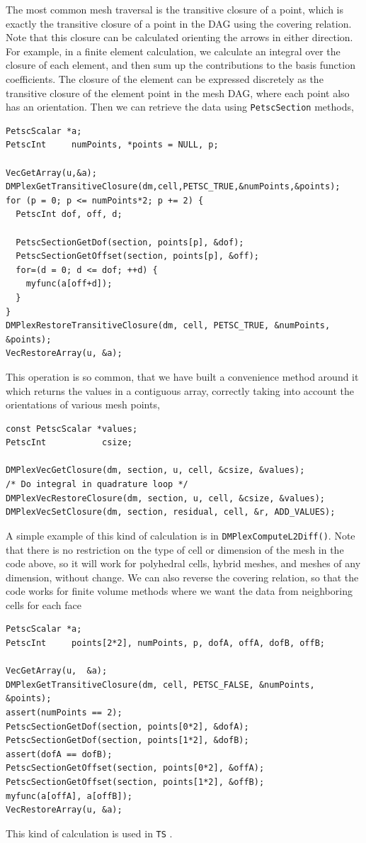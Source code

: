 The most common mesh traversal is the transitive closure of a point, which is exactly the transitive closure of a point
in the DAG using the covering relation. Note that this closure can be calculated orienting the arrows in either
direction. For example, in a finite element calculation, we calculate an integral over the closure of each element, and
then sum up the contributions to the basis function coefficients. The closure of the element can be expressed discretely
as the transitive closure of the element point in the mesh DAG, where each point also has an orientation. Then we can
retrieve the data using \lstinline{PetscSection} methods,
\begin{lstlisting}
PetscScalar *a;
PetscInt     numPoints, *points = NULL, p;

VecGetArray(u,&a);
DMPlexGetTransitiveClosure(dm,cell,PETSC_TRUE,&numPoints,&points);
for (p = 0; p <= numPoints*2; p += 2) {
  PetscInt dof, off, d;

  PetscSectionGetDof(section, points[p], &dof);
  PetscSectionGetOffset(section, points[p], &off);
  for=(d = 0; d <= dof; ++d) {
    myfunc(a[off+d]);
  }
}
DMPlexRestoreTransitiveClosure(dm, cell, PETSC_TRUE, &numPoints, &points);
VecRestoreArray(u, &a);
\end{lstlisting}
This operation is so common, that we have built a convenience method around it which returns the values in a contiguous
array, correctly taking into account the orientations of various mesh points,
\begin{lstlisting}
const PetscScalar *values;
PetscInt           csize;

DMPlexVecGetClosure(dm, section, u, cell, &csize, &values);
/* Do integral in quadrature loop */
DMPlexVecRestoreClosure(dm, section, u, cell, &csize, &values);
DMPlexVecSetClosure(dm, section, residual, cell, &r, ADD_VALUES);
\end{lstlisting}
A simple example of this kind of calculation is in \lstinline{DMPlexComputeL2Diff()}. Note that there is no restriction on the
type of cell or dimension of the mesh in the code above, so it will work for polyhedral cells, hybrid meshes, and meshes
of any dimension, without change. We can also reverse the covering relation, so that the code works for finite volume
methods where we want the data from neighboring cells for each face
\begin{lstlisting}
PetscScalar *a;
PetscInt     points[2*2], numPoints, p, dofA, offA, dofB, offB;

VecGetArray(u,  &a);
DMPlexGetTransitiveClosure(dm, cell, PETSC_FALSE, &numPoints, &points);
assert(numPoints == 2);
PetscSectionGetDof(section, points[0*2], &dofA);
PetscSectionGetDof(section, points[1*2], &dofB);
assert(dofA == dofB);
PetscSectionGetOffset(section, points[0*2], &offA);
PetscSectionGetOffset(section, points[1*2], &offB);
myfunc(a[offA], a[offB]);
VecRestoreArray(u, &a);
\end{lstlisting}
This kind of calculation is used in \lstinline{TS} \href{http://www.mcs.anl.gov/petsc/petsc-current/src/ts/examples/tutorials/ex11.c.html}{}.


